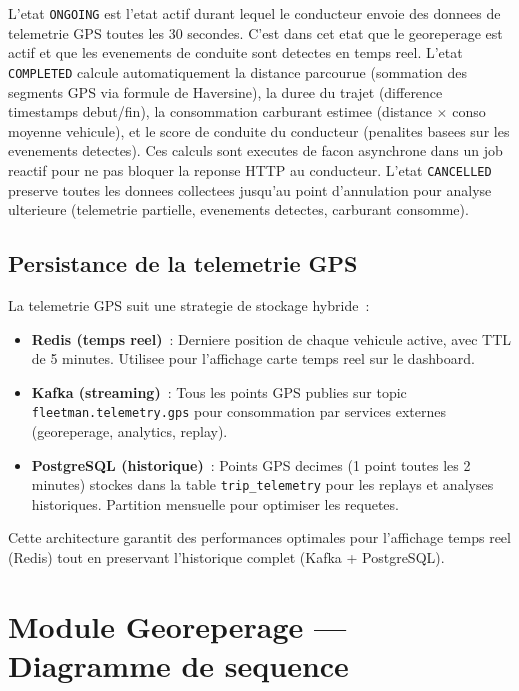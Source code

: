 \documentclass[12pt,a4paper]{report}
\begin{document}
\begin{lecture}
L'etat \texttt{ONGOING} est l'etat actif durant lequel le conducteur
envoie des donnees de telemetrie GPS toutes les 30 secondes. C'est dans
cet etat que le georeperage est actif et que les evenements de conduite
sont detectes en temps reel. L'etat \texttt{COMPLETED} calcule automatiquement
la distance parcourue (sommation des segments GPS via formule de Haversine),
la duree du trajet (difference timestamps debut/fin), la consommation carburant
estimee (distance $\times$ conso moyenne vehicule), et le score de conduite
du conducteur (penalites basees sur les evenements detectes). Ces calculs
sont executes de facon asynchrone dans un job reactif pour ne pas bloquer
la reponse HTTP au conducteur. L'etat \texttt{CANCELLED} preserve toutes
les donnees collectees jusqu'au point d'annulation pour analyse ulterieure
(telemetrie partielle, evenements detectes, carburant consomme).
\end{lecture}

\subsection{Persistance de la telemetrie GPS}

La telemetrie GPS suit une strategie de stockage hybride~:

\begin{itemize}[leftmargin=2cm]
  \item \textbf{Redis (temps reel)}~: Derniere position de chaque vehicule
        active, avec TTL de 5 minutes. Utilisee pour l'affichage carte
        temps reel sur le dashboard.
        
  \item \textbf{Kafka (streaming)}~: Tous les points GPS publies sur topic
        \texttt{fleetman.telemetry.gps} pour consommation par services
        externes (georeperage, analytics, replay).
        
  \item \textbf{PostgreSQL (historique)}~: Points GPS decimes (1 point toutes
        les 2 minutes) stockes dans la table \texttt{trip\_telemetry}
        pour les replays et analyses historiques. Partition mensuelle
        pour optimiser les requetes.
\end{itemize}

Cette architecture garantit des performances optimales pour l'affichage
temps reel (Redis) tout en preservant l'historique complet (Kafka + PostgreSQL).

\section{Module Georeperage --- Diagramme de sequence}
\end{document}
